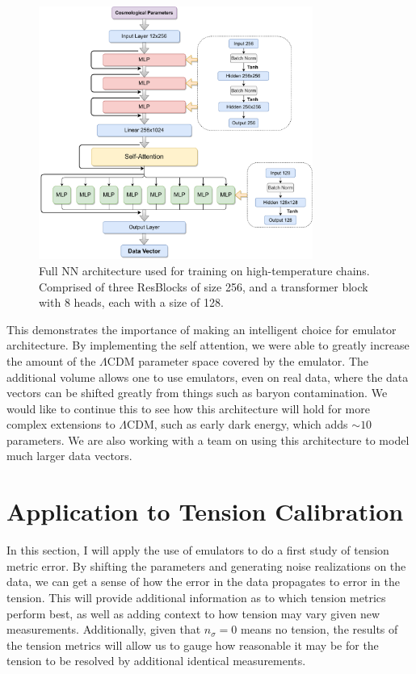 \begin{figure}[!tb]
	\centering
	\includegraphics[width=0.8\textwidth]{plots/Untitled Diagram.drawio-5.pdf}
	\caption{Full NN architecture used for training on high-temperature chains. Comprised of three ResBlocks of size 256, and a transformer block with 8 heads, each with a size of 128.}
	\label{fig:full_arch}
\end{figure}

This demonstrates the importance of making an intelligent choice for emulator architecture. By implementing the self attention, we were able to greatly increase the amount of the $\Lambda$CDM parameter space covered by the emulator. The additional volume allows one to use emulators, even on real data, where the data vectors can be shifted greatly from things such as baryon contamination. We would like to continue this to see how this architecture will hold for more complex extensions to $\Lambda$CDM, such as early dark energy, which adds $\sim10$ parameters. We are also working with a team on using this architecture to model much larger data vectors.

\section{Application to Tension Calibration}
In this section, I will apply the use of emulators to do a first study of tension metric error. By shifting the parameters and generating noise realizations on the data, we can get a sense of how the error in the data propagates to error in the tension. This will provide additional information as to which tension metrics perform best, as well as adding context to how tension may vary given new measurements. Additionally, given that $n_\sigma=0$ means no tension, the results of the tension metrics will allow us to gauge how reasonable it may be for the tension to be resolved by additional identical measurements.

